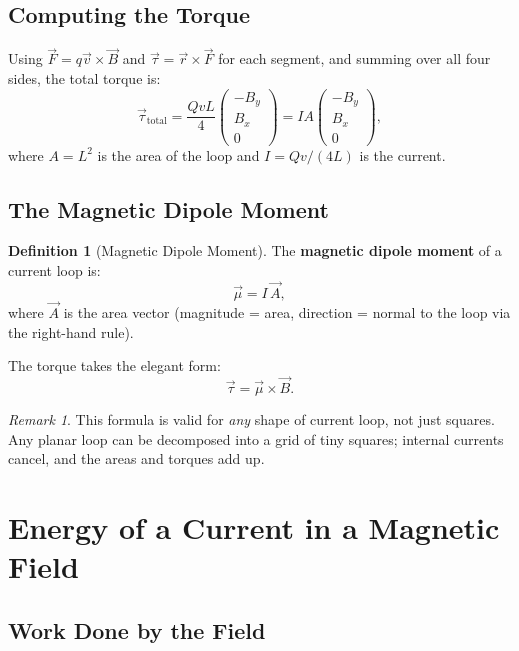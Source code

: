 \documentclass[11pt,a4paper]{article}
\theoremstyle{definition}
\newtheorem{definition}{Definition}[section]
\theoremstyle{plain}
\theoremstyle{remark}
\newtheorem{remark}{Remark}[section]
\begin{document}
\subsection{Computing the Torque}

Using $\vec{F} = q\vec{v}\times\vec{B}$ and $\vec{\tau} = \vec{r}\times\vec{F}$ for each segment, and summing over all four sides, the total torque is:
\[
    \vec{\tau}_{\text{total}} = \frac{QvL}{4}\begin{pmatrix}-B_y \\ B_x \\ 0\end{pmatrix} = IA\begin{pmatrix}-B_y \\ B_x \\ 0\end{pmatrix},
\]
where $A = L^2$ is the area of the loop and $I = Qv/(4L)$ is the current.

\subsection{The Magnetic Dipole Moment}

\begin{definition}[Magnetic Dipole Moment]
    The \textbf{magnetic dipole moment} of a current loop is:
    \[
        \vec{\mu} = I\,\vec{A},
    \]
    where $\vec{A}$ is the area vector (magnitude = area, direction = normal to the loop via the right-hand rule).
\end{definition}

The torque takes the elegant form:
\[
    \boxed{\vec{\tau} = \vec{\mu} \times \vec{B}.}
\]

\begin{remark}
    This formula is valid for \emph{any} shape of current loop, not just squares. Any planar loop can be decomposed into a grid of tiny squares; internal currents cancel, and the areas and torques add up.
\end{remark}

\section{Energy of a Current in a Magnetic Field}

\subsection{Work Done by the Field}
\end{document}
